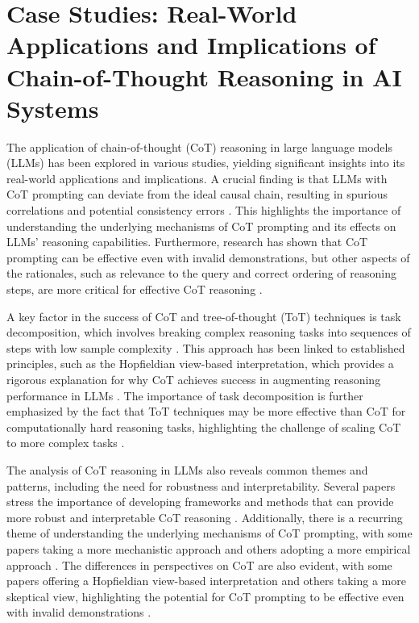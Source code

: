 \documentclass[conference]{IEEEtran}
\begin{document}
\section{Case Studies: Real-World Applications and Implications of Chain-of-Thought Reasoning in AI Systems}
The application of chain-of-thought (CoT) reasoning in large language models (LLMs) has been explored in various studies, yielding significant insights into its real-world applications and implications. A crucial finding is that LLMs with CoT prompting can deviate from the ideal causal chain, resulting in spurious correlations and potential consistency errors \cite{b1}. This highlights the importance of understanding the underlying mechanisms of CoT prompting and its effects on LLMs' reasoning capabilities. Furthermore, research has shown that CoT prompting can be effective even with invalid demonstrations, but other aspects of the rationales, such as relevance to the query and correct ordering of reasoning steps, are more critical for effective CoT reasoning \cite{b2}.

A key factor in the success of CoT and tree-of-thought (ToT) techniques is task decomposition, which involves breaking complex reasoning tasks into sequences of steps with low sample complexity \cite{b5}. This approach has been linked to established principles, such as the Hopfieldian view-based interpretation, which provides a rigorous explanation for why CoT achieves success in augmenting reasoning performance in LLMs \cite{b3, b4}. The importance of task decomposition is further emphasized by the fact that ToT techniques may be more effective than CoT for computationally hard reasoning tasks, highlighting the challenge of scaling CoT to more complex tasks \cite{b5}.

The analysis of CoT reasoning in LLMs also reveals common themes and patterns, including the need for robustness and interpretability. Several papers stress the importance of developing frameworks and methods that can provide more robust and interpretable CoT reasoning \cite{b1, b2}. Additionally, there is a recurring theme of understanding the underlying mechanisms of CoT prompting, with some papers taking a more mechanistic approach and others adopting a more empirical approach \cite{b1, b3}. The differences in perspectives on CoT are also evident, with some papers offering a Hopfieldian view-based interpretation \cite{b3, b4} and others taking a more skeptical view, highlighting the potential for CoT prompting to be effective even with invalid demonstrations \cite{b2}.
\end{document}
